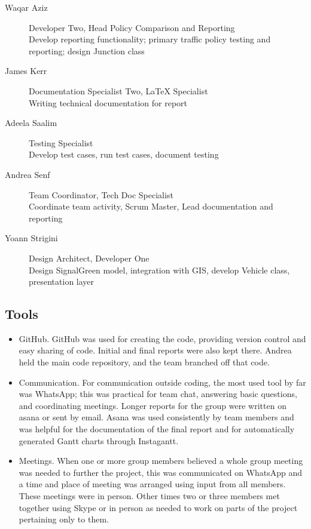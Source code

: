 \documentclass[11pt]{article}
\begin{document}
\begin{enumerate}
\begin{description}
\item [Waqar Aziz] \hspace{16 mm} Developer Two, Head Policy Comparison and Reporting \\
	Develop reporting functionality; primary traffic policy testing and reporting; design Junction class
\item[James Kerr] \hspace{16 mm}  Documentation Specialist Two, LaTeX Specialist \\
	Writing technical documentation for report
\item[Adeela Saalim] \hspace{11 mm} Testing Specialist \\
	Develop test cases, run test cases, document testing
\item[Andrea Senf] \hspace{15 mm} Team Coordinator, Tech Doc Specialist \\
	Coordinate team activity, Scrum Master, Lead documentation and reporting
\item[Yoann Strigini] \hspace{11 mm}  Design Architect, Developer One \\
	Design SignalGreen model, integration with GIS, develop Vehicle class, presentation layer
\end{description}

\subsection{Tools}

\begin{itemize}\itemsep0pt
\item GitHub. GitHub was used for creating the code, providing version control and easy sharing of code. Initial and final reports were also kept there. Andrea held the main code repository, and the team branched off that code.
\item Communication. For communication outside coding, the most used tool by far was WhatsApp; this was practical for team chat, answering basic questions, and coordinating meetings. Longer reports for the group were written on asana or sent by email. Asana was used consistently by team members and was helpful for the documentation of the final report and for automatically generated Gantt charts through Instagantt.
\item Meetings. When one or more group members believed a whole group meeting was needed to further the project, this was communicated on WhatsApp and a time and place of meeting was arranged using input from all members. These meetings were in person. Other times two or three members met together using Skype or in person as needed to work on parts of the project pertaining only to them.
\end{itemize}




\end{enumerate}
\end{document}
